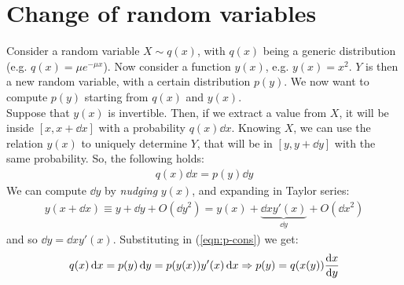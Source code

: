\documentclass[../template.tex]{subfiles}
\begin{document}

\section{Change of random variables}
Consider a random variable $X \sim q(x)$, with $q(x)$ being a generic distribution (e.g. $q(x) = \mu e^{-\mu x}$). Now consider a function $y(x)$, e.g. $y(x) = x^2$. $Y$ is then a new random variable, with a certain distribution $p(y)$. We now want to compute $p(y)$ starting from $q(x)$ and $y(x)$.\\
Suppose that $y(x)$ is invertible. Then, if we extract a value from $X$, it will be inside $[x,x+\dd{x}]$ with a probability $q(x) \dd{x}$. Knowing $X$, we can use the relation $y(x)$ to uniquely determine $Y$, that will be in $[y,y+\dd{y}]$ with the same probability. So, the following holds:
\begin{align}
    q(x) \dd{x} = p(y) \dd{y}
    \label{eqn:p-cons}
\end{align}        
We can compute $\dd{y}$ by \textit{nudging} $y(x)$, and expanding in Taylor series:  
\begin{align*}
    y(x+\dd{x}) \equiv y + \dd{y} + O(\dd{y}^2) = y(x) + \underbrace{\dd{x} y'(x)}_{\dd{y}} + O(\dd{x}^2) 
\end{align*} 
and so $\dd{y} = \dd{x} y'(x)$. Substituting in (\ref{eqn:p-cons}) we get:
\begin{align}
    q(x) \dd{x} = p(y)\dd{y} = p(y(x)) y'(x) \dd{x} \Rightarrow p(y) = q(x(y)) \dv{x}{y} (x(y))
    \label{eqn:simple-rule}
\end{align}  
\end{document}
